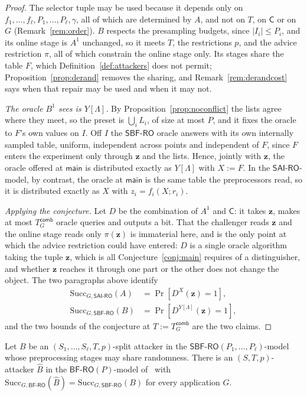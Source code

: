 \documentclass{conjura-conjecture}
\newcommand{\Succ}{\mathrm{Succ}}
\newcommand{\Prob}[1]{\Pr\!\left[#1\right]}
\newcommand{\vz}{\mathbf{z}}
\newcommand{\SAI}{\mathsf{SAI\text{-}RO}}
\newcommand{\SBF}{\mathsf{SBF\text{-}RO}}
\newcommand{\BF}{\mathsf{BF\text{-}RO}}
\newcommand{\main}{\mathsf{main}}
\newcommand{\Tcomb}{T^{\mathsf{comb}}_{G}}
\begin{document}
\begin{proof}
The selector tuple may be used because it depends only on
$f_1,\dots,f_\ell,P_1,\dots,P_\ell,\gamma$, all of which are determined by
$A$, and not on $T$, on $\mathsf{C}$ or on $G$ (Remark~\ref{rem:order}).
$B$ respects the presampling budgets, since $|I_i| \le P_i$, and its online
stage is $A^{1}$ unchanged, so it meets $T$, the restrictions $p$, and the
advice restriction $\pi$, all of which constrain the online stage only.
Its stages share the table $F$, which Definition~\ref{def:attackers} does
not permit; Proposition~\ref{prop:derand} removes the sharing, and
Remark~\ref{rem:derandcost} says when that repair may be used and when it
may not.

\emph{The oracle $B^{1}$ sees is $Y[\Lambda]$.} By
Proposition~\ref{prop:noconflict} the lists agree where they meet, so the
preset is $\bigcup_i L_i$, of size at most $P$, and it fixes the oracle to
$F$'s own values on $I$. Off $I$ the $\SBF$ oracle answers with its own
internally sampled table, uniform, independent across points and
independent of $F$, since $F$ enters the experiment only through $\vz$ and
the lists. Hence, jointly with $\vz$, the oracle offered at $\main$ is
distributed exactly as $Y[\Lambda]$ with $X := F$. In the $\SAI$-model, by
contrast, the oracle at $\main$ is the same table the preprocessors read,
so it is distributed exactly as $X$ with $z_i = f_i(X;r_i)$.

\emph{Applying the conjecture.} Let $D$ be the combination of $A^{1}$ and
$\mathsf{C}$: it takes $\vz$, makes at most $\Tcomb$ oracle queries and
outputs a bit. That the challenger reads $\vz$ and the online stage reads
only $\pi(\vz)$ is immaterial here, and is the only point at which the
advice restriction could have entered: $D$ is a single oracle algorithm
taking the tuple $\vz$, which is all Conjecture~\ref{conj:main} requires of
a distinguisher, and whether $\vz$ reaches it through one part or the other
does not change the object. The two paragraphs above identify
\[
\begin{aligned}
  \Succ_{G,\SAI}(A) &= \Prob{D^{X}(\vz) = 1}, \\
  \Succ_{G,\SBF}(B) &= \Prob{D^{Y[\Lambda]}(\vz) = 1} ,
\end{aligned}
\]
and the two bounds of the conjecture at $T := \Tcomb$ are the two claims.
\end{proof}

\begin{proposition}
\label{prop:merge}
Let $B$ be an $(S_1,\dots,S_\ell,T,p)$-split attacker in the
$\SBF(P_1,\dots,P_\ell)$-model whose preprocessing stages may share
randomness. There is an $(S,T,p)$-attacker $\widehat{B}$ in the
$\BF(P)$-model of~\cite[\S2.2.1]{CDGS} with
$\Succ_{G,\BF}(\widehat{B}) = \Succ_{G,\SBF}(B)$ for every application $G$.
\end{proposition}
\end{document}
